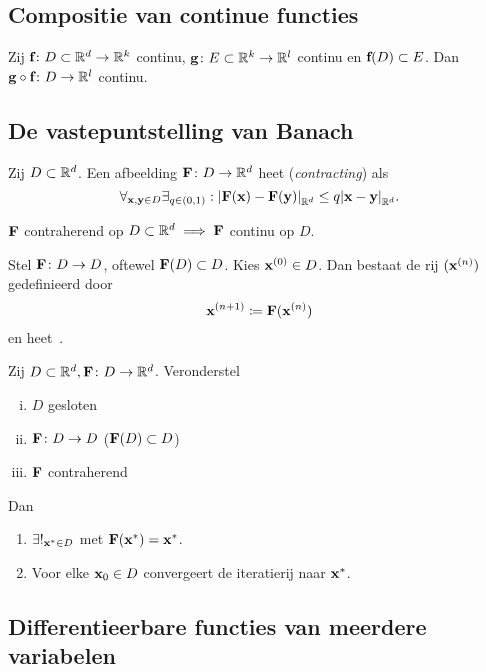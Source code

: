 \documentclass{2wa40summary}
\begin{document}
	\subsection{Compositie van continue functies}
	\theorem Zij ${\textbf{f}}\colon D\subset\mathbb{R}^d\to \mathbb{R}^k$ continu, ${\textbf{g}}\colon E\subset\mathbb{R}^k\to \mathbb{R}^l$ continu en ${\textbf{f}}(D) \subset E$. Dan ${\textbf{g}} \circ {\textbf{f}}\colon D\to \mathbb{R}^l$ continu.
	
	\subsection{De vastepuntstelling van Banach}
	\begin{theorem}
		Zij $D \subset \mathbb{R}^d$.
		Een afbeelding ${\textbf{F}}\colon D \to \mathbb{R}^d$ heet  (\textit{contracting}) als
		\[\forall _{{\textbf{x}},{\textbf{y}}\in D}\exists _{q \in (0,1)}:{\left|{\textbf{F}}({\textbf{x}})-{\textbf{F}}({\textbf{y}})\right|}_{\mathbb{R}^d} \leq q{\left|{\textbf{x}}-{\textbf{y}}\right|}_{\mathbb{R}^d}. \]
	\end{theorem}
	
	
	\gevolg ${\textbf{F}}$ contraherend op $D\subset\mathbb{R}^d\implies{\textbf{F}}$ continu op $D$.
	
	
	\begin{define}[iteratierij]
		Stel ${\textbf{F}}\colon D\to D$, oftewel ${\textbf{F}}(D) \subset D$. Kies  ${\textbf{x}}^{(0)} \in D$.
		Dan bestaat de rij $({\textbf{x}}^{(n)})$ gedefinieerd door
		\[
		{\textbf{x}}^{(n+1)} \coloneqq  {\textbf{F}}({\textbf{x}}^{(n)})
		\]
		en heet~.
	\end{define}
	
	
	
	Zij $D \subset \mathbb{R}^d, {\textbf{F}}\colon D\to \mathbb{R}^d$. Veronderstel
	\begin{enumerate}[(i)]
		\item $D$ gesloten
		\item ${\textbf{F}}\colon D \to D$ (${\textbf{F}}(D) \subset D$)
		\item ${\textbf{F}}$ contraherend
	\end{enumerate}
	Dan
	\begin{enumerate}[(1)]
		\item $\exists!_{{\textbf{x}}^* \in D}$ met ${\textbf{F}}({\textbf{x}}^*)={\textbf{x}}^*$.
		\item Voor elke ${\textbf{x}}_0 \in D$ convergeert de iteratierij naar ${\textbf{x}}^*$.
	\end{enumerate}
	
	\subsection{Differentieerbare functies van meerdere variabelen}
\end{document}
